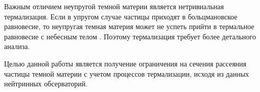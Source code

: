 Важным отличием неупругой темной материи является нетривиальная термализация. Если в упругом случае частицы приходят в больцмановское равновесие, то неупругая темная материя может не успеть прийти в термальное равновесие с небесным телом \cite{Blennow_2018}. Поэтому термализация требует более детального анализа.

Целью данной работы является получение ограничения на сечения рассеяния частицы темной материи с учетом процессов термализации, исходя из данных нейтринных обсерваторий.


